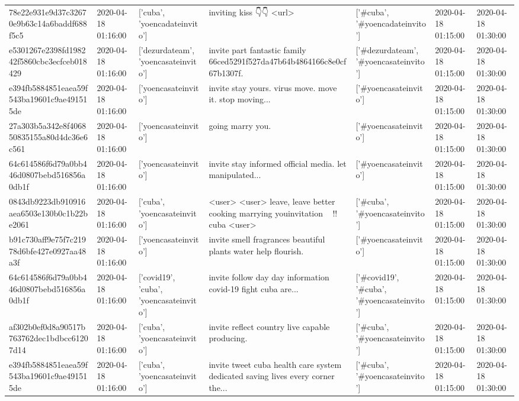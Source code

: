 \begin{tabular}{lllllll}
78e22e931e9d37c32670e9b63c14a6baddf688f5c5 & 2020-04-18 01:16:00 & ['cuba', 'yoencadateinvito'] & inviting kiss 👇👇 <url> & ['#cuba', '#yoencadateinvito'] & 2020-04-18 01:15:00 & 2020-04-18 01:30:00 \\
e5301267e2398fd198242f5860cbc3ecfceb018429 & 2020-04-18 01:16:00 & ['dezurdateam', 'yoencasateinvito'] & invite part fantastic family 66ced5291f527da47b64b4864166c8e0cf67b1307f. & ['#dezurdateam', '#yoencasateinvito'] & 2020-04-18 01:15:00 & 2020-04-18 01:30:00 \\
e394fb5884851eaea59f543ba19601c9ae491515de & 2020-04-18 01:16:00 & ['yoencasateinvito'] & invite stay yours. virus move. move it. stop moving... & ['#yoencasateinvito'] & 2020-04-18 01:15:00 & 2020-04-18 01:30:00 \\
27a303b5a342e8f406850835155a80d4dc36e6c561 & 2020-04-18 01:16:00 & ['yoencasateinvito'] & going marry you. & ['#yoencasateinvito'] & 2020-04-18 01:15:00 & 2020-04-18 01:30:00 \\
64c614586f6d79a0bb446d0807bebd516856a0db1f & 2020-04-18 01:16:00 & ['yoencasateinvito'] & invite stay informed official media. let manipulated... & ['#yoencasateinvito'] & 2020-04-18 01:15:00 & 2020-04-18 01:30:00 \\
0843db9223db910916aea6503e130b0c1b22be2061 & 2020-04-18 01:16:00 & ['cuba', 'yoencasateinvito'] & <user> <user> leave, leave better cooking marrying youinvitation 🤣🤣🤣!!️ cuba <user> & ['#cuba', '#yoencasateinvito'] & 2020-04-18 01:15:00 & 2020-04-18 01:30:00 \\
b91c730aff9e75f7c21978d6bfe427e0927aa48a3f & 2020-04-18 01:16:00 & ['yoencasateinvito'] & invite smell fragrances beautiful plants water help flourish. & ['#yoencasateinvito'] & 2020-04-18 01:15:00 & 2020-04-18 01:30:00 \\
64c614586f6d79a0bb446d0807bebd516856a0db1f & 2020-04-18 01:16:00 & ['covid19', 'cuba', 'yoencasateinvito'] & invite follow day day information covid-19 fight cuba are... & ['#covid19', '#cuba', '#yoencasateinvito'] & 2020-04-18 01:15:00 & 2020-04-18 01:30:00 \\
af302b0ef0d8a90517b763762dec1bdbcc61207d14 & 2020-04-18 01:16:00 & ['cuba', 'yoencasateinvito'] & invite reflect country live capable producing. & ['#cuba', '#yoencasateinvito'] & 2020-04-18 01:15:00 & 2020-04-18 01:30:00 \\
e394fb5884851eaea59f543ba19601c9ae491515de & 2020-04-18 01:16:00 & ['cuba', 'yoencasateinvito'] & invite tweet cuba health care system dedicated saving lives every corner the... & ['#cuba', '#yoencasateinvito'] & 2020-04-18 01:15:00 & 2020-04-18 01:30:00 \\

\end{tabular}
